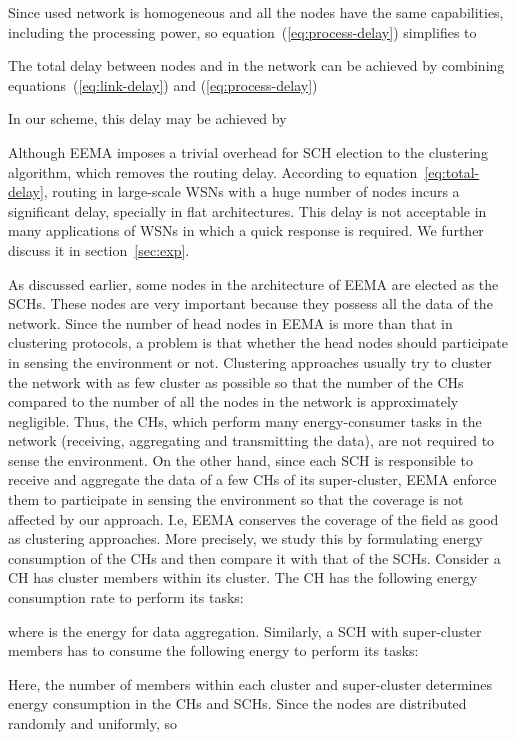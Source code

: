 \documentclass[journal]{IEEEtran}
\begin{document}
Since used network is homogeneous and all the nodes have the same capabilities, including the processing power, so equation~(\ref{eq:process-delay}) simplifies to

The total delay between nodes  and  in the network can be achieved by combining equations~(\ref{eq:link-delay}) and (\ref{eq:process-delay})

In our scheme, this delay may be achieved by

Although EEMA imposes a trivial overhead for SCH election to the clustering algorithm, which removes the routing delay.  According to equation~\eqref{eq:total-delay}, routing in large-scale WSNs with a huge number of nodes incurs a significant delay, specially in flat architectures.  This delay is not acceptable in many applications of WSNs in which a quick response is required.  We further discuss it in section~\ref{sec:exp}. 

As discussed earlier,  some nodes in the architecture of EEMA are elected as the SCHs.  These nodes are very important because they possess all the data of the network.  Since the number of head nodes in EEMA is more than that in clustering protocols, a problem is that whether the head nodes should participate in sensing the environment or not.  Clustering approaches usually try to cluster the network with as few cluster as possible so that the number of the CHs compared to the number of all the nodes in the network is approximately negligible.  Thus, the CHs, which perform many energy-consumer tasks in the network (receiving, aggregating and transmitting the data), are not required to sense the environment.  On the other hand, since each SCH is responsible to receive and aggregate the data of a few CHs of its super-cluster, EEMA enforce them to participate in sensing the environment so that the coverage is not affected by our approach.  I.e, EEMA conserves the coverage of the field as good as clustering approaches.  More precisely,  we study this by formulating energy consumption of the CHs and then compare it with that of the SCHs.  Consider a CH has  cluster members within its cluster.  The CH has the following energy consumption rate  to perform its tasks:
 
where  is the energy for data aggregation.  Similarly, a SCH with  super-cluster members has to consume the following energy to perform its tasks:
 
Here, the number of members within each cluster and super-cluster determines energy consumption in the CHs and SCHs.  Since the nodes are distributed randomly and uniformly, so
\end{document}
